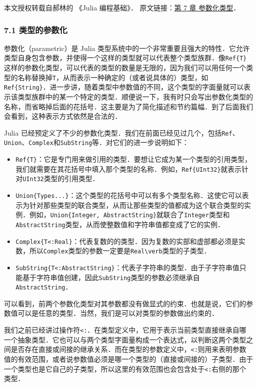 
本文授权转载自郝林的 《Julia 编程基础》． 原文链接：\href{https://github.com/hyper0x/JuliaBasics/blob/master/book/ch07.md}{第 7 章 参数化类型}．


\subsubsection{7.1 类型的参数化}

参数化（parametric）是 Julia 类型系统中的一个非常重要且强大的特性．它允许类型自身包含参数，并使得一个这样的类型就可以代表整个类型族群．像\verb|Ref{T}|这样的参数化类型，可以代表的类型的数量是无限的，因为我们可以用任何一个类型的名称替换掉\verb|T|，从而表示一种确定的（或者说具体的）类型，如\verb|Ref{String}|．进一步讲，随着类型中参数值的不同，这个类型的字面量就可以表示该类型族群中的某一个特定的类型．顺便说一下，我有时只会写出参数化类型的名称，而省略掉后面的花括号．这主要是为了简化描述和节约篇幅．到了后面我们会看到，这种表示方式依然是合法的．

Julia 已经预定义了不少的参数化类型．我们在前面已经见过几个，包括\verb|Ref|、\verb|Union|、\verb|Complex|和\verb|SubString|等．对它们的进一步说明如下：

\begin{itemize}
\item \verb|Ref{T}|：它是专门用来做引用的类型．要想让它成为某一个类型的引用类型，我们就需要在其花括号中填入那个类型的名称．例如，\verb|Ref{UInt32}|就表示针对\verb|UInt32|类型的引用类型．
\item \verb|Union{Types...}|：这个类型的花括号中可以有多个类型名称．这使它可以表示为针对那些类型的联合类型，从而让那些类型的值都成为这个联合类型的实例．例如，\verb|Union{Integer, AbstractString}|就联合了\verb|Integer|类型和\verb|AbstractString|类型，从而使整数值和字符串值都变成了它的实例．
\item \verb|Complex{T<:Real}|：代表复数的的类型．因为复数的实部和虚部都必须是实数，所以\verb|Complex|类型的参数一定要是\verb|Real\verb|类型的子类型．
\item \verb|SubString{T<:AbstractString}|：代表子字符串的类型．由于子字符串值只能基于字符串值创建，因此\verb|SubString|类型的参数必须继承自\verb|AbstractString|．
\end{itemize}

可以看到，前两个参数化类型对其参数都没有做显式的约束．也就是说，它们的参数值可以是任意的类型．当然，我们是可以对类型的参数做出约束的．

我们之前已经讲过操作符\verb|<:|．在类型定义中，它用于表示当前类型直接继承自哪一个抽象类型．它也可以与两个类型字面量构成一个表达式，以判断这两个类型之间是否存在直接或间接的继承关系．而在类型的参数定义中，\verb|<:|则用来表明参数值的有效范围，或者说参数值必须是哪一个类型的（直接或间接的）子类型．由于一个类型也是它自己的子类型，所以这里的有效范围也会包含处于\verb|<:|右侧的那个类型．

